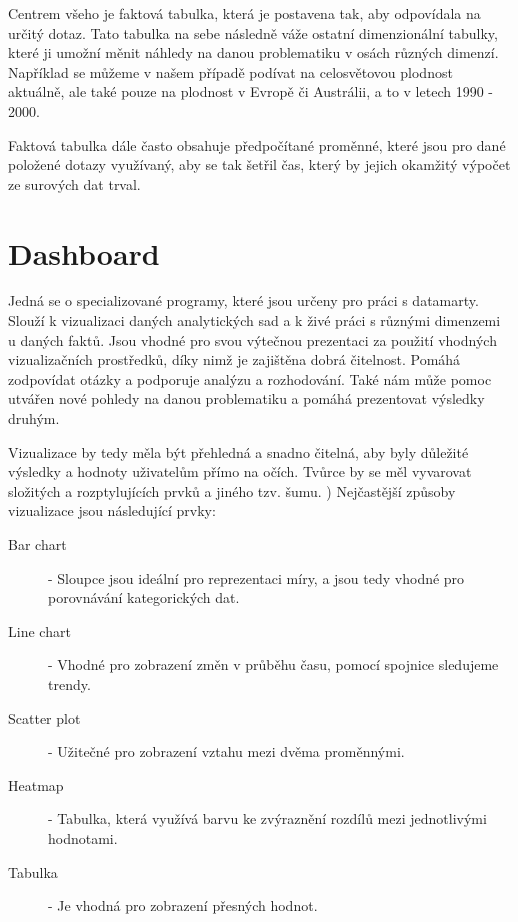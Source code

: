\documentclass[thesis=M,czech]{FITthesis}[2022/10/08]
\begin{document}
Centrem všeho je faktová tabulka, která je postavena tak, aby odpovídala na určitý dotaz. Tato tabulka na sebe následně váže ostatní dimenzionální tabulky, které ji umožní měnit náhledy na danou problematiku v osách různých dimenzí. Například se můžeme v našem případě podívat na celosvětovou plodnost aktuálně, ale také pouze na plodnost v Evropě či Austrálii, a to v letech 1990 - 2000. 

Faktová tabulka dále často obsahuje předpočítané proměnné, které jsou pro dané položené dotazy využívaný, aby se tak šetřil čas, který by jejich okamžitý výpočet ze surových dat trval. \cite{EDW5}

\section{Dashboard}

Jedná se o specializované programy, které jsou určeny pro práci s datamarty. Slouží k vizualizaci daných analytických sad a k živé práci s různými dimenzemi u daných faktů. Jsou vhodné pro svou výtečnou prezentaci za použití vhodných vizualizačních prostředků, díky nimž je zajištěna dobrá čitelnost. Pomáhá zodpovídat otázky a podporuje analýzu a rozhodování. Také nám může pomoc utvářen nové pohledy na danou problematiku a pomáhá prezentovat výsledky druhým.

Vizualizace by tedy měla být přehledná a snadno čitelná, aby byly důležité výsledky a hodnoty uživatelům přímo na očích. Tvůrce by se měl vyvarovat složitých a rozptylujících prvků a jiného tzv. šumu. \cite{EDW5})
Nejčastější způsoby vizualizace jsou následující prvky:

\begin{description}
    \item[Bar chart] - Sloupce jsou ideální pro reprezentaci míry, a jsou tedy vhodné pro porovnávání kategorických dat.
    
    \item[Line chart]  - Vhodné pro zobrazení změn v průběhu času, pomocí spojnice sledujeme trendy.
    
    \item[Scatter plot] - Užitečné pro zobrazení vztahu mezi dvěma proměnnými.
    \item[Heatmap] - Tabulka, která využívá barvu ke zvýraznění rozdílů mezi jednotlivými hodnotami.

    \item[Tabulka] - Je vhodná pro zobrazení přesných hodnot.
    \cite{EDW5}
\end{description}
\end{document}
